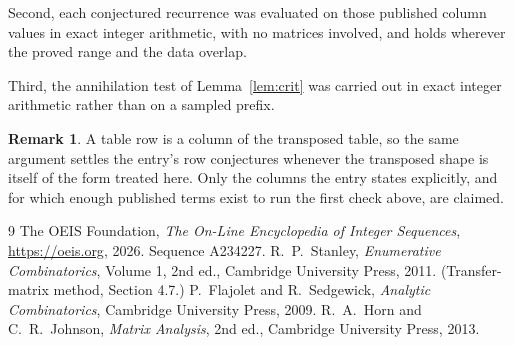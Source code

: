 \documentclass[11pt,a4paper]{article}
\theoremstyle{plain}
\theoremstyle{definition}
\newtheorem{remark}[theorem]{Remark}
\begin{document}
Second, each conjectured recurrence was evaluated on those published column values in exact
integer arithmetic, with no matrices involved, and holds wherever the proved range and the
data overlap.

Third, the annihilation test of Lemma~\ref{lem:crit} was carried out in exact integer
arithmetic rather than on a sampled prefix.

\begin{remark}
A table row is a column of the transposed table, so the same argument settles the entry's row
conjectures whenever the transposed shape is itself of the form treated here. Only the columns
the entry states explicitly, and for which enough published terms exist to run the first check
above, are claimed.
\end{remark}

\begin{thebibliography}{9}
 The OEIS Foundation, \emph{The On-Line Encyclopedia of Integer
Sequences}, \url{https://oeis.org}, 2026. Sequence A234227.
 R.~P.~Stanley, \emph{Enumerative Combinatorics}, Volume 1, 2nd ed.,
Cambridge University Press, 2011. (Transfer-matrix method, Section 4.7.)
 P.~Flajolet and R.~Sedgewick, \emph{Analytic Combinatorics}, Cambridge
University Press, 2009.
 R.~A.~Horn and C.~R.~Johnson, \emph{Matrix Analysis}, 2nd ed., Cambridge
University Press, 2013.
\end{thebibliography}
\end{document}
